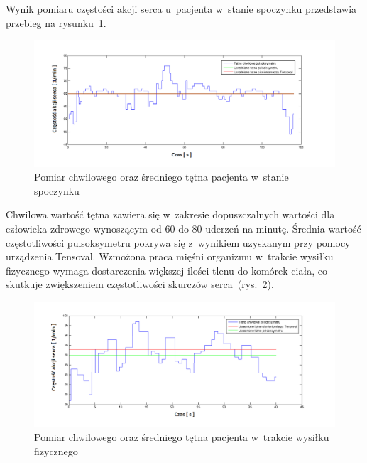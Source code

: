 \noindent Wynik pomiaru częstości akcji serca u~pacjenta w~stanie spoczynku przedstawia przebieg na rysunku~\ref{rys:Tetno_D_2}.
\begin{figure}[!h]
	\centerline{\includegraphics[scale = 0.63]{graphic/Tetno_D_2}}
	\caption{Pomiar chwilowego oraz średniego tętna pacjenta w~stanie spoczynku}
	\label{rys:Tetno_D_2}
\end{figure}

\noindent Chwilowa wartość tętna zawiera się w~zakresie dopuszczalnych wartości dla człowieka zdrowego wynoszącym od 60 do 80 uderzeń na minutę. 
Średnia wartość częstotliwości pulsoksymetru pokrywa się z~wynikiem uzyskanym przy pomocy urządzenia Tensoval.
\noindent Wzmożona praca mięśni organizmu w~trakcie wysiłku fizycznego wymaga dostarczenia większej ilości tlenu do komórek ciała, co skutkuje zwiększeniem
częstotliwości skurczów serca~(rys.~\ref{rys:Tetno_D_1}). 
\begin{figure}[!ht]
	\centerline{\includegraphics[scale = 0.62]{graphic/Tetno_D_1}}
	\caption{Pomiar chwilowego oraz średniego tętna pacjenta w~trakcie wysiłku fizycznego}
	\label{rys:Tetno_D_1}
\end{figure}

